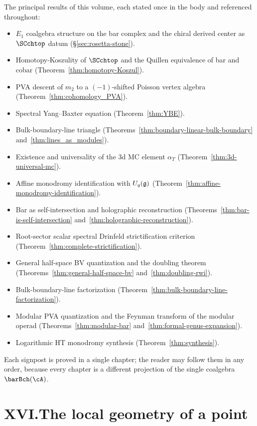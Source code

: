 The principal results of this volume, each stated once in the
body and referenced throughout:
\begin{itemize}[leftmargin=2em,itemsep=2pt]
\item $E_1$ coalgebra structure on the bar complex and the
 chiral derived center as $\SCchtop$ datum
 (\S\ref{sec:rosetta-stone}).
\item Homotopy-Koszulity of $\SCchtop$ and the Quillen
 equivalence of bar and cobar
 (Theorem~\ref{thm:homotopy-Koszul}).
\item PVA descent of $m_2$ to a $(-1)$-shifted Poisson vertex
 algebra (Theorem~\ref{thm:cohomology_PVA}).
\item Spectral Yang--Baxter equation
 (Theorem~\ref{thm:YBE}).
\item Bulk-boundary-line triangle
 (Theorems~\ref{thm:boundary-linear-bulk-boundary}
 and~\ref{thm:lines_as_modules}).
\item Existence and universality of the 3d MC element $\alpha_T$
 (Theorem~\ref{thm:3d-universal-mc}).
\item Affine monodromy identification with $U_q(\mathfrak{g})$
 (Theorem~\ref{thm:affine-monodromy-identification}).
\item Bar as self-intersection and holographic reconstruction
 (Theorems~\ref{thm:bar-is-self-intersection}
 and~\ref{thm:holographic-reconstruction}).
\item Root-sector scalar spectral Drinfeld strictification criterion
 (Theorem~\ref{thm:complete-strictification}).
\item General half-space BV quantization and the doubling
 theorem (Theorems~\ref{thm:general-half-space-bv}
 and~\ref{thm:doubling-rwi}).
\item Bulk-boundary-line factorization
 (Theorem~\ref{thm:bulk-boundary-line-factorization}).
\item Modular PVA quantization and the Feynman transform of the
 modular operad (Theorems~\ref{thm:modular-bar}
 and~\ref{thm:formal-genus-expansion}).
\item Logarithmic HT monodromy synthesis
 (Theorem~\ref{thm:synthesis}).
\end{itemize}
Each signpost is proved in a single chapter; the reader may
follow them in any order, because every chapter is a different
projection of the single coalgebra $\barBch(\cA)$.

\section*{XVI.\quad The local geometry of a point}

